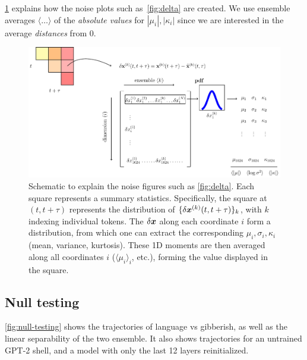 \documentclass{article} %
\begin{document}
\cref{fig:noise-schematic} explains how the noise plots such as~\cref{fig:delta} are created.
We use ensemble averages $\langle \dots \rangle$ of the \emph{absolute values} for $|\mu_i|, |\kappa_i|$ since we are interested in the average \emph{distances} from 0.

\begin{figure}[htbp]
\vskip 0.2in
\begin{center}
\centerline{\includegraphics[width=\columnwidth]{fig/figS-noise-schematic-v03.pdf}}
\caption{
Schematic to explain the noise figures such as \cref{fig:delta}.
Each square represents a summary statistics.
Specifically, the square at $(t,t+\tau)$ represents the distribution of $\{ \delta {\bm{x}}^{(k)}(t,t+\tau) \}_k$, with $k$ indexing individual tokens.
The $\delta {\bm{x}}$ along each coordinate $i$ form a distribution, from which one can extract the corresponding $\mu_i, \sigma_i, \kappa_i$ (mean, variance, kurtosis). 
These 1D moments are then averaged along all coordinates $i$ ($\langle \mu_i \rangle_i$, etc.), forming the value displayed in the square.
}
\label{fig:noise-schematic}
\end{center}
\vskip -0.2in
\end{figure}


\subsection{Null testing}
\label{app:null-testing}
\cref{fig:null-testing} shows the trajectories of language vs gibberish, as well as the linear separability of the two ensemble.
It also shows trajectories for an untrained GPT-2 shell, and a model with only the last 12 layers reinitialized.
\end{document}
